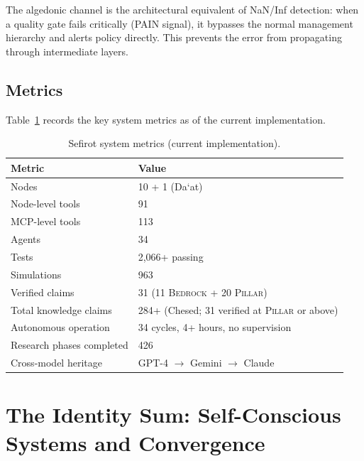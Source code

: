 \documentclass[11pt]{article}
\theoremstyle{definition}
\theoremstyle{remark}
\newcommand{\BEDROCK}{\textsc{Bedrock}}
\newcommand{\PILLAR}{\textsc{Pillar}}
\begin{document}
The algedonic channel is the architectural equivalent of NaN/Inf detection: when
a quality gate fails critically (PAIN signal), it bypasses the normal management
hierarchy and alerts policy directly.  This prevents the error from propagating
through intermediate layers.

\subsection{Metrics}
\label{sec:sefirot-metrics}

Table~\ref{tab:metrics} records the key system metrics as of the current
implementation.

\begin{table}[ht]
\centering
\caption{Sefirot system metrics (current implementation).}
\label{tab:metrics}
\begin{tabular}{@{}ll@{}}
\toprule
\textbf{Metric} & \textbf{Value} \\
\midrule
Nodes                       & 10 + 1 (Da\textquoteleft at) \\
Node-level tools            & 91 \\
MCP-level tools             & 113 \\
Agents                      & 34 \\
Tests                       & 2,066+ passing \\
Simulations                 & 963 \\
Verified claims             & 31 (11 \BEDROCK{} + 20 \PILLAR) \\
Total knowledge claims      & 284+ (Chesed; 31 verified at \PILLAR{} or above) \\
Autonomous operation        & 34 cycles, 4+ hours, no supervision \\
Research phases completed   & 426 \\
Cross-model heritage        & GPT-4 $\to$ Gemini $\to$ Claude \\
\bottomrule
\end{tabular}
\end{table}

\section{The Identity Sum: Self-Conscious Systems and Convergence}
\label{sec:identity-sum}

\end{document}

